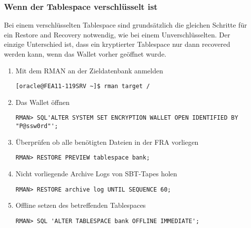         \subsubsection{Wenn der Tablespace verschl\"usselt ist}
          \label{recoverencryptedts}
          Bei einem verschl\"usselten Tablespace sind grunds\"atzlich die gleichen Schritte f\"ur ein Restore and Recovery notwendig, wie bei einem Unverschl\"usselten. Der einzige Unterschied ist, dass ein kryptierter Tablespace nur dann recovered werden kann, wenn das Wallet vorher ge\"offnet wurde.
          \begin{enumerate}
            \item Mit dem RMAN an der Zieldatenbank anmelden
              \begin{lstlisting}[caption={An der Zieldatenbank anmelden},label=admin1461,language=terminal]
[oracle@FEA11-119SRV ~]$ rman target /
              \end{lstlisting}
            \item Das Wallet \"offnen
              \begin{lstlisting}[caption={\"Offnen des Wallets},label=admin1462,language=rman,emph={[9]ALTER,SYSTEM,SET,ENCRYPTION,WALLET,OPEN,IDENTIFIED,BY},emphstyle={[9]\color{magenta}\bfseries}]
RMAN> SQL'ALTER SYSTEM SET ENCRYPTION WALLET OPEN IDENTIFIED BY "P@ssw0rd"';
              \end{lstlisting}
            \item \"Uberpr\"ufen ob alle ben\"otigten Dateien in der FRA vorliegen
              \begin{lstlisting}[caption={Voraussetzungen \"uberpr\"ufen},label=admin1463,language=rman]
RMAN> RESTORE PREVIEW tablespace bank;
              \end{lstlisting}
            \item Nicht vorliegende Archive Logs von SBT-Tapes holen
              \begin{lstlisting}[caption={Voraussetzungen \"uberpr\"ufen},label=admin1464,language=rman]
RMAN> RESTORE archive log UNTIL SEQUENCE 60;
              \end{lstlisting}
            \item Offline setzen des betreffenden Tablespaces
              \begin{lstlisting}[caption={Betreffenden Tablespace Offline setzen},label=admin1465,language=rman,emph={[9]ALTER,TABLESPACE,OFFLINE,IMMEDIATE},emphstyle={[9]\color{magenta}\bfseries}]
RMAN> SQL 'ALTER TABLESPACE bank OFFLINE IMMEDIATE';
              \end{lstlisting}

\end{enumerate}
